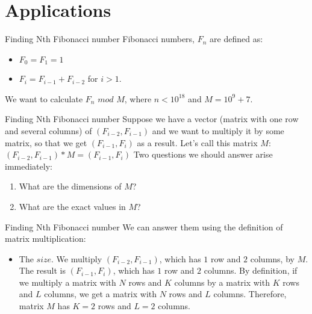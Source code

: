 \documentclass{beamer}
\begin{document}
\section{Applications}

\begin{frame}{Finding Nth Fibonacci number}
  Fibonacci numbers, $F_n$ are defined as:
  \begin{itemize}
    \item $F_0 = F_1 = 1$
    \item $F_i = F_{i-1} + F_{i-2}$ for $i > 1$.
  \end{itemize}
  \pause
  We want to calculate $F_n$ $mod$ $M$, where $n < 10^{18}$ and $M = 10^9 + 7$.
\end{frame}

\begin{frame}{Finding Nth Fibonacci number}
  Suppose we have a vector (matrix with 
  one row and several columns) of $(F_{i-2}, F_{i-1})$
  and we want to multiply it by some matrix, so that we get $(F_{i-1}, F_i)$ as a result.
  \pause \newline
  Let's call this matrix $M$: \newline
  $(F_{i-2}, F_{i-1}) * M = (F_{i-1}, F_i)$ \newline \newline
  Two questions we should answer arise immediately:
  \begin{enumerate}
    \item What are the dimensions of $M$?
    \item What are the exact values in $M$?
  \end{enumerate}
\end{frame}

\begin{frame}{Finding Nth Fibonacci number}
  We can answer them using the definition of matrix multiplication: \newline
  \pause
  \begin{itemize}
    \item The $size$. \newline
      We multiply $(F_{i-2}, F_{i-1})$, which has $1$ row and $2$ columns, by $M$. 
      \newline
      The result is $(F_{i-1}, F_i)$, which has $1$ row and $2$ columns.
      \pause \newline \newline
      By definition, if we multiply a matrix with $N$ rows and $K$ columns by 
      a matrix with $K$ rows and $L$ columns, we get a matrix with $N$ rows and $L$ columns.
      \newline \newline
      Therefore, matrix $M$ has $K = 2$ rows and $L = 2$ columns.
  \end{itemize}
\end{frame}
\end{document}
